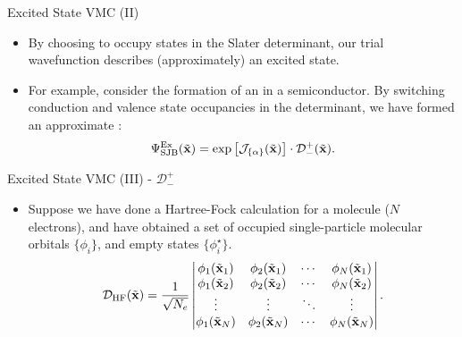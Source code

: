 \documentclass[12pt, pdf, hyperref={draft}, usenames, dvipsnames,
aspectratio=169]{beamer}
\newcommand{\red}[1]{{\bf\color{LancsRed}{#1}}}
\newcommand{\blue}[1]{{\bf\color{NavyBlue}{#1}}}
\begin{document}
\begin{frame}{Excited State VMC (II)}
\begin{itemize}
  \item By choosing to occupy \blue{empty} states in the Slater determinant,
  our trial wavefunction describes (approximately) an excited state.

  \item For example, consider the formation of an \red{exciton} in a
  semiconductor. By switching conduction and valence state occupancies in the
  determinant, we have formed an approximate \red{excitonic wave function}:
  \begin{equation}
    \Psi^{\text{Ex}}_{\text{SJB}}({\tilde{\bf x}}) = \exp{\left[
    \mathcal{J}_{\{ \alpha \}}({\tilde{\bf x}})\right]} \cdot
    \mathcal{D}^{+}_{-}({\tilde{\bf x}}).
  \end{equation}
\end{itemize}
\end{frame}


\begin{frame}{Excited State VMC (III) - $\mathcal{D}^{+}_{-}$}
\begin{itemize}
  \item Suppose we have done a Hartree-Fock calculation for a molecule ($N$
  electrons), and have obtained a set of occupied single-particle molecular
  orbitals $\{\phi_i \}$, and empty states $\{\phi^{\star}_{i} \}$.
  \begin{equation}
    \mathcal{D_{\text{HF}}({\tilde{\bf x}})} = \dfrac{1}{\sqrt{N_e}}
    \begin{vmatrix}
    \phi_1(\tilde{\bf x}_1) & \phi_2(\tilde{\bf x}_1)  & \cdots &
    \phi_N(\tilde{\bf x}_1) \\
    \phi_1(\tilde{\bf x}_2) & \phi_2(\tilde{\bf x}_2)  & \cdots &
    \phi_N(\tilde{\bf x}_2) \\
    \vdots  & \vdots & \ddots &\vdots \\
    \phi_1(\tilde{\bf x}_{N}) & \phi_2(\tilde{\bf x}_N) & \cdots &
    \phi_N(\tilde{\bf x}_N) \\
    \end{vmatrix}.
  \end{equation}
\end{itemize}
\end{frame}
\end{document}
